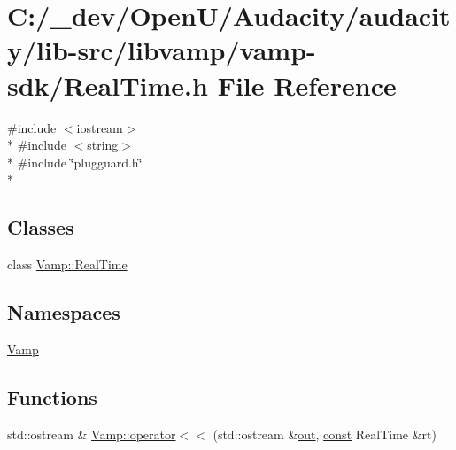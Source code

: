 \hypertarget{vamp-sdk_2_real_time_8h}{}\section{C\+:/\+\_\+dev/\+Open\+U/\+Audacity/audacity/lib-\/src/libvamp/vamp-\/sdk/\+Real\+Time.h File Reference}
\label{vamp-sdk_2_real_time_8h}
{\ttfamily \#include $<$iostream$>$}\\*
{\ttfamily \#include $<$string$>$}\\*
{\ttfamily \#include \char`\"{}plugguard.\+h\char`\"{}}\\*
\subsection*{Classes}
\begin{DoxyCompactItemize}
\item 
class \hyperlink{struct_vamp_1_1_real_time}{Vamp\+::\+Real\+Time}
\end{DoxyCompactItemize}
\subsection*{Namespaces}
\begin{DoxyCompactItemize}
\item 
 \hyperlink{namespace_vamp}{Vamp}
\end{DoxyCompactItemize}
\subsection*{Functions}
\begin{DoxyCompactItemize}
\item 
std\+::ostream \& \hyperlink{namespace_vamp_a84f347b339c111e035f4f0d6ed37f4e0}{Vamp\+::operator$<$$<$} (std\+::ostream \&\hyperlink{latency_8c_a71fd1c281affec034757279e4f91c50b}{out}, \hyperlink{getopt1_8c_a2c212835823e3c54a8ab6d95c652660e}{const} Real\+Time \&rt)
\end{DoxyCompactItemize}
